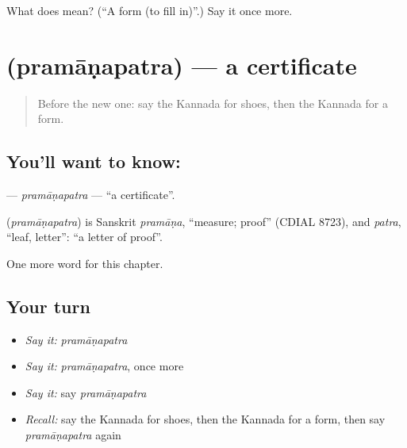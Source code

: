 \begin{tcolorbox}[breakable,colback=teal!4,colframe=teal!35!black,title={Before you move on}]
What does  mean? (\textquotedblleft{}A form (to fill in)\textquotedblright{}.) Say it once more.
\end{tcolorbox}
\section[\texorpdfstring{\kn{ಪ್ರಮಾಣಪತ್ರ} (pramāṇapatra)}{ಪ್ರಮಾಣಪತ್ರ (pramāṇapatra)}]{ (pramāṇapatra) — a certificate}

\label{lesson:KA-C223-pramanapatra}



\begin{quote}
Before the new one: say the Kannada for shoes, then the Kannada for a form.
\end{quote}

\subsection*{You'll want to know: }
\textbf{} — \emph{pramāṇapatra} — \textquotedblleft{}a certificate\textquotedblright{}.

\begin{cousinweb}
\textbf{} (\emph{pramāṇapatra}) is Sanskrit \emph{pramāṇa}, \textquotedblleft{}measure; proof\textquotedblright{} (CDIAL 8723), and \emph{patra}, \textquotedblleft{}leaf, letter\textquotedblright{}: \textquotedblleft{}a letter of proof\textquotedblright{}.
\end{cousinweb}

\begin{grammarlens}[title={What you've built}]
One more word for this chapter.
\end{grammarlens}

\subsection*{Your turn}
\begin{itemize}
\raggedright
  \item \emph{Say it:} \emph{pramāṇapatra}
  \item \emph{Say it:} \emph{pramāṇapatra}, once more
  \item \emph{Say it:} say \emph{pramāṇapatra}
  \item \emph{Recall:} say the Kannada for shoes, then the Kannada for a form, then say \emph{pramāṇapatra} again
\end{itemize}


